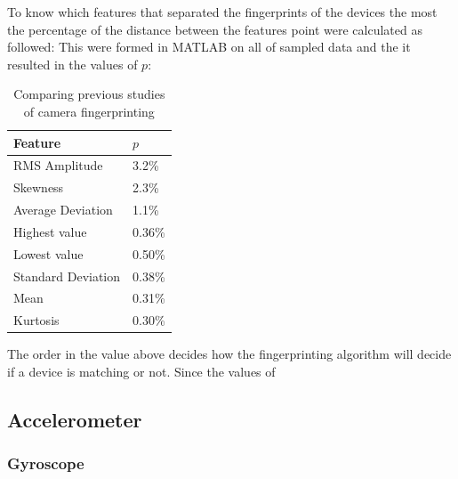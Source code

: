 To know which features that separated the fingerprints of the devices the most the percentage of the distance between the features point were calculated as followed:
This were formed in MATLAB on all of sampled data and the it resulted in the values of $p$:
\begin{table}[H]
	\centering
	\begin{tabular}{| p{4cm} | p{1cm} |}
	  Feature 			& $p$ 		\\ \hline
	  RMS Amplitude 	& 3.2\% 	\\
	  Skewness 			& 2.3\% 	\\
	  Average Deviation & 1.1\% 	\\
	  Highest value		& 0.36\% 	\\
	  Lowest value		& 0.50\% 	\\
	  Standard Deviation& 0.38\% 	\\
	  Mean 				& 0.31\% 	\\
	  Kurtosis 			& 0.30\% 	\\ \hline
	\end{tabular}
	\caption[Table caption text]{Comparing previous studies of camera fingerprinting} \label{table:prevCamera}
\end{table}
The order in the value above decides how the fingerprinting algorithm will decide if a device is matching or not. Since the values of 
\subsection{Accelerometer}

\subsubsection{Gyroscope}

